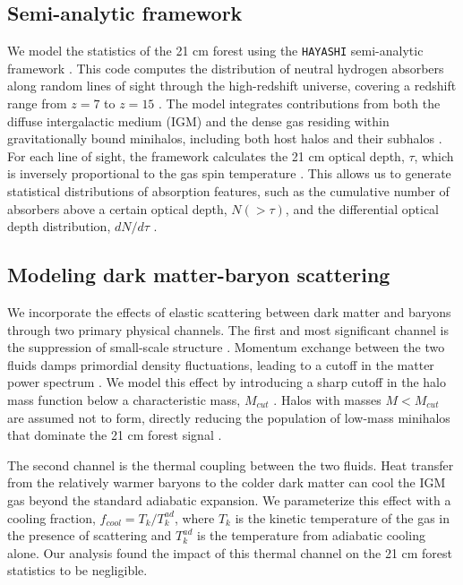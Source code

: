 \documentclass[]{article}
\begin{document}
\subsection{Semi-analytic framework}

We model the statistics of the 21 cm forest using the \texttt{HAYASHI} semi-analytic framework \citep{Furlanetto_2002,Shao_2025,Xu_2009}. This code computes the distribution of neutral hydrogen absorbers along random lines of sight through the high-redshift universe, covering a redshift range from $z=7$ to $z=15$ \citep{Xu_2009,Furlanetto_2002,_oltinsk__2021,Shao_2025}. The model integrates contributions from both the diffuse intergalactic medium (IGM) and the dense gas residing within gravitationally bound minihalos, including both host halos and their subhalos \citep{Furlanetto_2002,_oltinsk__2021,Xu__2018}. For each line of sight, the framework calculates the 21 cm optical depth, $\tau$, which is inversely proportional to the gas spin temperature \citep{Xu_2009,šoltinský2025prospectsstatisticaldetection21cm}. This allows us to generate statistical distributions of absorption features, such as the cumulative number of absorbers above a certain optical depth, $N(>\tau)$, and the differential optical depth distribution, $dN/d\tau$ \citep{Furlanetto_2002,Shao_2025,šoltinský2025prospectsstatisticaldetection21cm}.

\subsection{Modeling dark matter-baryon scattering}

We incorporate the effects of elastic scattering between dark matter and baryons through two primary physical channels. The first and most significant channel is the suppression of small-scale structure \citep{Liu_2019,Dvorkin_2014,Slatyer_2018,tashiro2014effectsdarkmatterbaryonscattering,Rahimieh_2026,Halder_2021}. Momentum exchange between the two fluids damps primordial density fluctuations, leading to a cutoff in the matter power spectrum \citep{Dvorkin_2014,Liu_2019}. We model this effect by introducing a sharp cutoff in the halo mass function below a characteristic mass, $M_{cut}$ \citep{Liu_2019}. Halos with masses $M < M_{cut}$ are assumed not to form, directly reducing the population of low-mass minihalos that dominate the 21 cm forest signal \citep{Liu_2019,tashiro2014effectsdarkmatterbaryonscattering,Slatyer_2018,Halder_2021,Rahimieh_2026}.

The second channel is the thermal coupling between the two fluids. Heat transfer from the relatively warmer baryons to the colder dark matter can cool the IGM gas beyond the standard adiabatic expansion. \citep{Mu_oz_2017,short2022darkmatterbaryonscatteringeffects} We parameterize this effect with a cooling fraction, $f_{cool} = T_k / T_k^{ad}$, where $T_k$ is the kinetic temperature of the gas in the presence of scattering and $T_k^{ad}$ is the temperature from adiabatic cooling alone. Our analysis found the impact of this thermal channel on the 21 cm forest statistics to be negligible.
\end{document}
